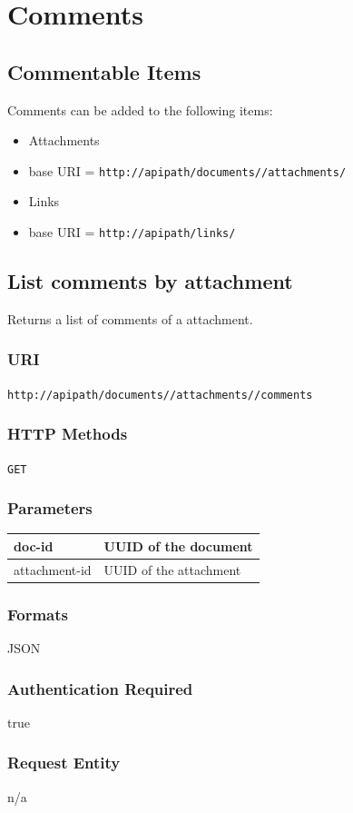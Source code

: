 \documentclass[10pt]{article}
\begin{document}
\section{Comments}
\subsection{Commentable Items}
Comments can be added to the following items:
\begin{itemize}
 \item Attachments
   \item base URI = \texttt{\texttt{http://apipath/documents//attachments/}
} \item Links
   \item base URI = \texttt{\texttt{http://apipath/links/} }
\end{itemize}
\subsection{List comments by attachment}
Returns a list of comments of a attachment.
\subsubsection{URI}
\texttt{http://apipath/documents//attachments//comments
}\subsubsection{HTTP Methods}
\texttt{GET}
\subsubsection{Parameters}
\begin{tabular}{|l|l|}\hline
doc-id & UUID of the document \\
\hline
attachment-id & UUID of the attachment \\
\hline
\end{tabular}
\subsubsection{Formats}
JSON
\subsubsection{Authentication Required}
true
\subsubsection{Request Entity}
n/a
\end{document}
